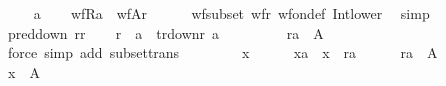 \begin{isabellebody}
\ \ \isamarkupfalse%
\ {\isacharparenleft}{\kern0pt}{}\ a{\isacharparenright}{\kern0pt}\isanewline
\ \ \isamarkupfalse%
\ wfRa\ {\isacharcolon}{\kern0pt}\ {\isachardoublequoteopen}wf{\isacharbrackleft}{\kern0pt}A{\isacharbrackright}{\kern0pt}{\isacharparenleft}{\kern0pt}r{\isacharparenright}{\kern0pt}{\isachardoublequoteclose}\isanewline
\ \ \ \ \isamarkupfalse%
\ wf{\isacharunderscore}{\kern0pt}subset\ wfr\ wf{\isacharunderscore}{\kern0pt}on{\isacharunderscore}{\kern0pt}def\ Int{\isacharunderscore}{\kern0pt}lower{}\ \isamarkupfalse%
\ simp\isanewline
\ \ \isamarkupfalse%
\ pred{\isacharunderscore}{\kern0pt}down\ rr\isanewline
\ \ \isamarkupfalse%
\ {\isachardoublequoteopen}r\ {\isacharminus}{\kern0pt}{\isacharbackquote}{\kern0pt}{\isacharbackquote}{\kern0pt}\ {\isacharbraceleft}{\kern0pt}a{\isacharbraceright}{\kern0pt}\ {\isasymsubseteq}\ tr{\isacharunderscore}{\kern0pt}down{\isacharparenleft}{\kern0pt}r{\isacharcomma}{\kern0pt}\ a{\isacharparenright}{\kern0pt}{\isachardoublequoteclose}\ \isacommand{{\isachardot}{\kern0pt}}\isamarkupfalse%
\isanewline
\ \ \isamarkupfalse%
\ {}\isanewline
\ \ \isamarkupfalse%
\ {\isachardoublequoteopen}r{\isacharminus}{\kern0pt}{\isacharbackquote}{\kern0pt}{\isacharbackquote}{\kern0pt}{\isacharbraceleft}{\kern0pt}a{\isacharbraceright}{\kern0pt}\ {\isasymsubseteq}\ A{\isachardoublequoteclose}\ \isamarkupfalse%
\ {\isacharparenleft}{\kern0pt}force\ simp\ add{\isacharcolon}{\kern0pt}\ subset{\isacharunderscore}{\kern0pt}trans{\isacharparenright}{\kern0pt}\isanewline
\ \ \isacommand{{\isacharbraceleft}{\kern0pt}}\isamarkupfalse%
\isanewline
\ \ \ \ \isamarkupfalse%
\ x\isanewline
\ \ \ \ \isamarkupfalse%
\ x{\isacharunderscore}{\kern0pt}a\ {\isacharcolon}{\kern0pt}\ {\isachardoublequoteopen}x\ {\isasymin}\ r{\isacharminus}{\kern0pt}{\isacharbackquote}{\kern0pt}{\isacharbackquote}{\kern0pt}{\isacharbraceleft}{\kern0pt}a{\isacharbraceright}{\kern0pt}{\isachardoublequoteclose}\isanewline
\ \ \ \ \isamarkupfalse%
\ {\isacartoucheopen}r{\isacharminus}{\kern0pt}{\isacharbackquote}{\kern0pt}{\isacharbackquote}{\kern0pt}{\isacharbraceleft}{\kern0pt}a{\isacharbraceright}{\kern0pt}\ {\isasymsubseteq}\ A{\isacartoucheclose}\isanewline
\ \ \ \ \isamarkupfalse%
\ {\isachardoublequoteopen}x\ {\isasymin}\ A{\isachardoublequoteclose}\ \isacommand{{\isachardot}{\kern0pt}{\isachardot}{\kern0pt}}\isamarkupfalse%

\end{isabellebody}
